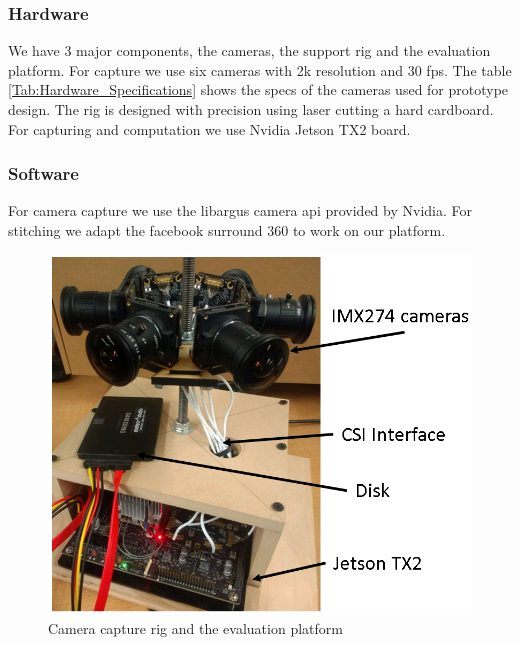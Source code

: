 \subsubsection{Hardware}
We have 3 major components, the cameras, the support rig and the evaluation platform. For capture we use six cameras with 2k resolution and 30 fps. The table \ref{Tab:Hardware_Specifications} shows the specs of the cameras used for prototype design. The rig is designed with precision using laser cutting a hard cardboard.  For capturing and computation we use Nvidia Jetson TX2 board.

\subsubsection{Software}
For camera capture we use the libargus camera api provided by Nvidia. For stitching we adapt the facebook surround 360 to work on our platform.
\begin{figure}[h]
	\begin{center}
		\includegraphics[width=1.1\textwidth]{data/images/Prototype.png}
	\end{center}
	\caption{Camera capture rig and the evaluation platform}
	\label{fig:Prototype}
\end{figure} 


